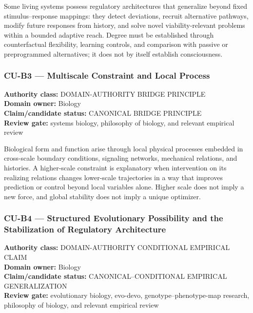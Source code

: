 \documentclass[
  11pt,
]{article}
\begin{document}
Some living systems possess regulatory architectures that generalize
beyond fixed stimulus--response mappings: they detect deviations,
recruit alternative pathways, modify future responses from history, and
solve novel viability-relevant problems within a bounded adaptive reach.
Degree must be established through counterfactual flexibility, learning
controls, and comparison with passive or preprogrammed alternatives; it
does not by itself establish consciousness.

\subsubsection{CU-B3 --- Multiscale Constraint and Local
Process}\label{cu-b3-multiscale-constraint-and-local-process}

\textbf{Authority class:} DOMAIN-AUTHORITY BRIDGE PRINCIPLE\\
\textbf{Domain owner:} Biology\\
\textbf{Claim/candidate status:} CANONICAL BRIDGE PRINCIPLE\\
\textbf{Review gate:} systems biology, philosophy of biology, and
relevant empirical review

Biological form and function arise through local physical processes
embedded in cross-scale boundary conditions, signaling networks,
mechanical relations, and histories. A higher-scale constraint is
explanatory when intervention on its realizing relations changes
lower-scale trajectories in a way that improves prediction or control
beyond local variables alone. Higher scale does not imply a new force,
and global stability does not imply a unique optimizer.

\subsubsection{CU-B4 --- Structured Evolutionary Possibility and the
Stabilization of Regulatory
Architecture}\label{cu-b4-structured-evolutionary-possibility-and-the-stabilization-of-regulatory-architecture}

\textbf{Authority class:} DOMAIN-AUTHORITY CONDITIONAL EMPIRICAL CLAIM\\
\textbf{Domain owner:} Biology\\
\textbf{Claim/candidate status:} CANONICAL--CONDITIONAL EMPIRICAL
GENERALIZATION\\
\textbf{Review gate:} evolutionary biology, evo-devo,
genotype--phenotype-map research, philosophy of biology, and relevant
empirical review
\end{document}
